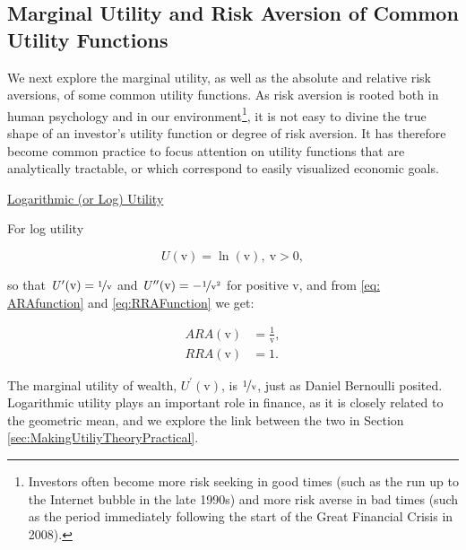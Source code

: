 \documentclass[graybox,envcountchap,sectrefs]{svmono}\usepackage[]{graphicx}\usepackage[]{xcolor}
\begin{document}
\begin{appendices}
\subsection*{}

\subsection*{Marginal Utility and Risk Aversion of Common Utility Functions}

We next explore the marginal utility, as well as the absolute and
relative risk aversions, of some common utility functions. As risk
aversion is rooted both in human psychology and in our environment\footnote{Investors often become more risk seeking in good times (such as the
run up to the Internet bubble in the late 1990s) and more risk averse
in bad times (such as the period immediately following the start of
the Great Financial Crisis in 2008).}, it is not easy to divine the true shape of an investor's utility
function or degree of risk aversion. It has therefore become common
practice to focus attention on utility functions that are analytically
tractable, or which correspond to easily visualized economic goals.

\medskip{}

\uline{Logarithmic (or Log) Utility}

For log utility

\begin{equation}
\mathit{U}(\mathit{\mathrm{v}})=\ln(\mathrm{v}),\ \mathrm{v}>0,\label{eq:LogUtility}
\end{equation}

so that $\mathit{U^{\prime}}(\mathit{\mathrm{v}})=\nicefrac{1}{\mathrm{v}}$
and $\mathit{U^{\prime\prime}}(\mathit{\mathrm{v}})=-\nicefrac{1}{\mathrm{v}^{2}}$
for positive $\mathrm{v}$, and from \eqref{eq: ARAfunction} and
\eqref{eq:RRAFunction} we get:

\begin{subequations}
\begin{align}
ARA\left(\mathrm{v}\right) & =\frac{1}{\mathrm{v}},\label{eq:ARALogUtility}\\
RRA\left(\mathrm{v}\right) & =1.\label{eq:RRALogUtility}
\end{align}
\end{subequations}

The marginal utility of wealth, $\mathit{U^{\prime}}(\mathit{\mathrm{v}})$,
is $\nicefrac{1}{\mathrm{v}}$, just as Daniel Bernoulli posited.
Logarithmic utility plays an important role in finance, as it is closely
related to the geometric mean, and we explore the link between the
two in Section \ref{sec:MakingUtiliyTheoryPractical}.


\end{appendices}
\end{document}
